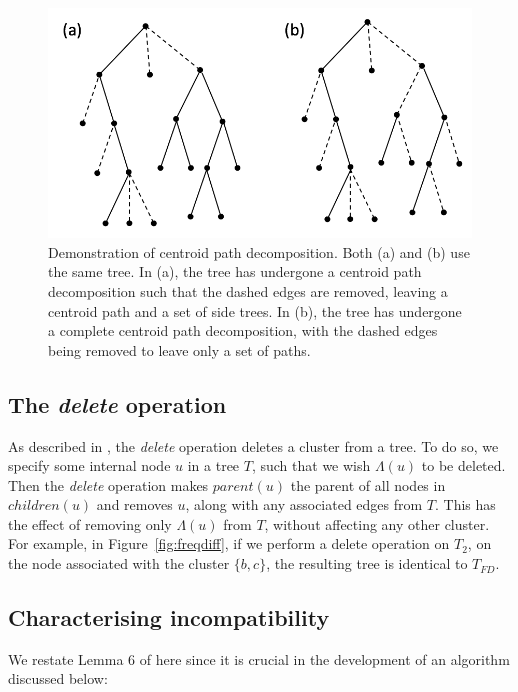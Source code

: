 \documentclass{article}
\newcommand{\leafset}{\Lambda}
\begin{document}
    \begin{figure}[h]
        \includegraphics[scale=0.5]{centroid}
        \centering
        \caption{Demonstration of centroid path decomposition. Both (a) and (b) use the same tree. In (a), the tree has undergone a centroid path decomposition such that the dashed edges are removed, leaving a centroid path and a set of side trees. In (b), the tree has undergone a complete centroid path decomposition, with the dashed edges being removed to leave only a set of paths.}
        \label{fig:centroid}
    \end{figure}

    \subsection{The \textit{delete} operation}
    \label{subsec:delete}

    As described in \cite{jansson2018algorithms}, the \textit{delete} operation deletes a cluster from a tree. To do so, we specify some internal node $u$ in a tree $T$, such that we wish $\leafset(u)$ to be deleted. Then the \textit{delete} operation makes $parent(u)$ the parent of all nodes in $children(u)$ and removes $u$, along with any associated edges from $T$. This has the effect of removing only $\leafset(u)$ from $T$, without affecting any other cluster. For example, in Figure~\ref{fig:freqdiff}, if we perform a delete operation on $T_2$, on the node associated with the cluster $\{b, c\}$, the resulting tree is identical to $T_{FD}$.

    \subsection{Characterising incompatibility}

    We restate Lemma 6 of \cite{jansson2018algorithms} here since it is crucial in the development of an algorithm discussed below:
    \newline
\end{document}

